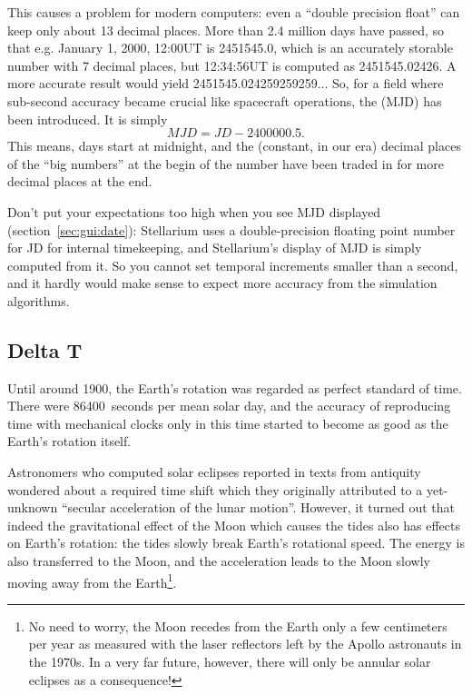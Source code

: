 This causes a problem for modern computers: even a ``double precision
float'' can keep only about 13 decimal places. More than 2.4 million
days have passed, so that e.g. January 1, 2000, 12:00UT is 2451545.0,
which is an accurately storable number with 7 decimal places, but 12:34:56UT is computed as
2451545.02426. A more accurate result would yield
2451545.024259259259... So, for a field where sub-second accuracy
became crucial like spacecraft operations, the  (MJD) has been introduced. It is simply
\begin{equation}
  \label{eq:MJD}
  MJD=JD-2400000.5. 
\end{equation}
This means, days start at midnight, and the (constant, in our era)
decimal places of the ``big numbers'' at the begin of the number have
been traded in for more decimal places at the end. 

Don't put your expectations too high when you see MJD displayed
(section~\ref{sec:gui:date}): Stellarium uses a double-precision
floating point number for JD for internal timekeeping, and Stellarium's
display of MJD is simply computed from it. So you cannot set temporal
increments smaller than a second, and it hardly would make sense to
expect more accuracy from the simulation algorithms.


\subsection{Delta T}
\label{sec:Concepts:DeltaT}

Until around 1900, the Earth's rotation was regarded as perfect
standard of time. There were 86400~seconds per mean solar day, and the
accuracy of reproducing time with mechanical clocks only in this time
started to become as good as the Earth's rotation itself.

Astronomers who computed solar eclipses reported in texts from
antiquity wondered about a required time shift which they originally
attributed to a yet-unknown ``secular acceleration of the lunar
motion''. However, it turned out that indeed the gravitational effect
of the Moon which causes the tides also has effects on Earth's
rotation: the tides slowly break Earth's rotational speed. The energy
is also transferred to the Moon, and the acceleration leads to the
Moon slowly moving away from the Earth\footnote{No need to worry, the
  Moon recedes from the Earth only a few centimeters per year as
  measured with the laser reflectors left by the Apollo astronauts in
  the 1970s. In a very far future, however, there will only be annular
  solar eclipses as a consequence!}.

